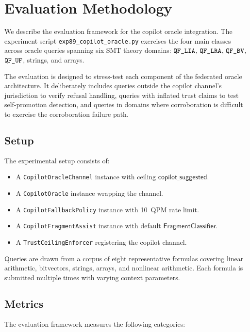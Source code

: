 \documentclass[11pt]{article}
\newcommand{\CopChan}{\texttt{CopilotOracleChannel}}
\newcommand{\CopOracle}{\texttt{CopilotOracle}}
\newcommand{\CopFallback}{\texttt{CopilotFallbackPolicy}}
\newcommand{\CopFragment}{\texttt{CopilotFragmentAssist}}
\newcommand{\TCeil}{\texttt{TrustCeilingEnforcer}}
\newcommand{\copilottrust}{$\mathsf{copilot\_suggested}$}
\begin{document}
\section{Evaluation Methodology}\label{sec:experiments}

We describe the evaluation framework for the copilot oracle
integration.  The experiment script
\texttt{exp89\_copilot\_oracle.py} exercises the four main classes
across oracle queries spanning six SMT theory domains: $\texttt{QF\_LIA}$,
$\texttt{QF\_LRA}$, $\texttt{QF\_BV}$, $\texttt{QF\_UF}$, strings, and arrays.

The evaluation is designed to stress-test each component of the
federated oracle architecture.  It deliberately includes queries
outside the copilot channel's jurisdiction to verify refusal
handling, queries with inflated trust claims to test self-promotion
detection, and queries in domains where corroboration is difficult
to exercise the corroboration failure path.

\subsection{Setup}\label{sec:exp-setup}

The experimental setup consists of:
\begin{itemize}
  \item A \CopChan{} instance with ceiling \copilottrust{}.
  \item A \CopOracle{} instance wrapping the channel.
  \item A \CopFallback{} instance with 10~QPM rate limit.
  \item A \CopFragment{} instance with default
    $\mathsf{FragmentClassifier}$.
  \item A \TCeil{} registering the copilot channel.
\end{itemize}

Queries are drawn from a corpus of eight representative formulas
covering linear arithmetic, bitvectors, strings, arrays, and
nonlinear arithmetic.  Each formula is submitted multiple times
with varying context parameters.

\subsection{Metrics}\label{sec:exp-metrics}

The evaluation framework measures the following categories:
\end{document}
